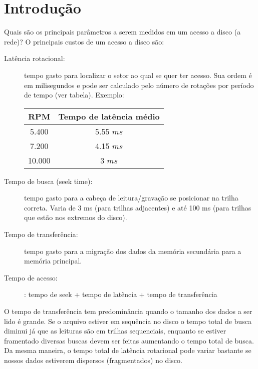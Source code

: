 \documentclass[10pt,a4paper]{article}
\begin{document}
\section{Introdução}
Quais são os principais parâmetros a serem medidos em um acesso a
disco (a rede)?
O principais custos de um acesso a disco são:
\begin{description}
\item [Latência rotacional:] tempo gasto para localizar o 
setor ao qual se quer ter acesso. Sua ordem é em milisegundos e pode
ser calculado pelo número de rotações por período de tempo (ver
tabela). Exemplo:

\begin{table}[h!]
\begin{center}
\begin{tabular}{cc}
\hline
\hline
RPM &  Tempo de latência médio \\
\hline
5.400 & 5.55 $ms$ \\
7.200 & 4.15 $ms$\\
10.000 & 3 $ms$
\end{tabular}
\end{center}
\end{table}

\item [Tempo de busca (seek time):] tempo gasto para a cabeça de 
leitura/gravação se posicionar na trilha correta. Varia de 3 ms (para trilhas adjacentes) e até 100 ms (para trilhas que estão nos extremos do disco).

\item[Tempo de transferência:]  tempo gasto para a 
migração dos dados da memória secundária para a 
memória principal.

\item[Tempo de acesso:]: tempo de seek + tempo de latência + tempo de transferência
\end{description}

O tempo de transferência tem predominância quando o tamanho dos dados
a ser lido é grande.
Se o arquivo estiver em sequência no disco o tempo total de busca diminui
já que as leituras são em trilhas sequenciais, enquanto se estiver
framentado diversas buscas devem ser feitas aumentando o tempo total
de busca.
Da mesma maneira, o tempo total de latência rotacional pode variar bastante
se nossos dados estiverem dispersos (fragmentados) no disco. 
\end{document}
